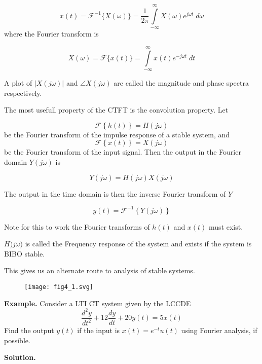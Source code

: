 \documentclass{article}
\begin{document}
\[
x(t) = \mathcal{F}^{-1}\{X(\omega)\} = \frac{1}{2\pi} \int\limits_{-\infty}^{\infty} X(\omega)e^{j\omega t}\; d\omega
\]
where the Fourier transform is

\[
X(\omega) = \mathcal{F}\{x(t)\} = \int\limits_{-\infty}^{\infty} x(t) e^{-j\omega t}\; dt
\]

A plot of $|X(j\omega)|$ and $\angle X(j\omega)$ are called the magnitude and phase spectra respectively.

The most usefull property of the CTFT is the convolution property. Let

\[
\mathcal{F}\left\{ h(t) \right\} = H(j\omega)
\]
be the Fourier transform of the impulse response of a stable system, and
\[
\mathcal{F}\left\{ x(t) \right\} = X(j\omega)
\]
be the Fourier transform of the input signal. Then the output in the Fourier domain $Y(j\omega)$ is

\[
Y(j\omega) = H(j\omega)X(j\omega)
\]

The output in the time domain is then the inverse Fourier transform of $Y$

\[
y(t) = \mathcal{F}^{-1}\left\{ Y(j\omega) \right\}
\]

Note for this to work the Fourier transforms of $h(t)$ and $x(t)$ must exist.

$H)j\omega)$ is called the Frequency response of the system and exists if the system is BIBO stable.

This gives us an alternate route to analysis of stable systems.

\begin{figure}
  \centering
  \texttt{[image: fig4\_1.svg]}
\end{figure}

\textbf{Example.} Consider a LTI CT system given by the LCCDE
\[
\frac{d^2y}{dt^2} + 12\frac{dy}{dt} + 20y(t) = 5x(t)
\]
Find the output $y(t)$ if the input is $x(t) = e^{-t}u(t)$ using Fourier analysis, if possible.

\textbf{Solution.}
\end{document}
